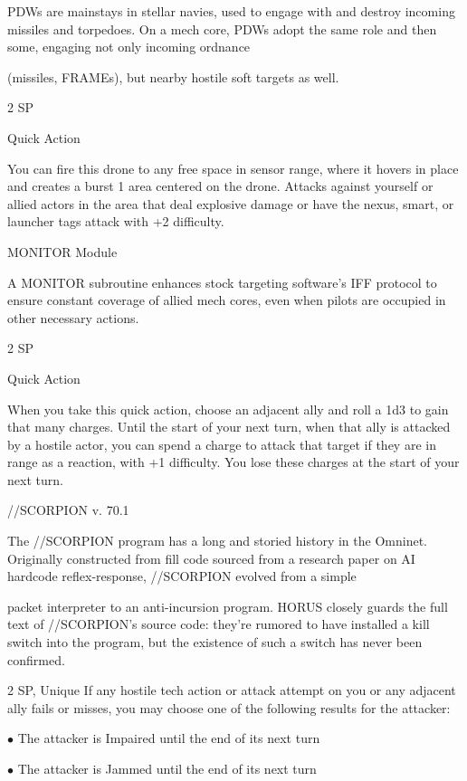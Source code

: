 PDWs are mainstays in stellar navies, used to engage with and destroy incoming missiles and torpedoes.
On a mech core, PDWs adopt the same role and then some, engaging not only incoming ordnance

(missiles, FRAMEs), but nearby hostile soft targets as well.

2 SP

Quick Action

You can fire this drone to any free space in sensor range, where it hovers in place and creates a
burst 1 area centered on the drone. Attacks against yourself or allied actors in the area that deal
explosive damage or have the nexus, smart, or launcher tags attack with +2 difficulty.


MONITOR Module

A MONITOR subroutine enhances stock targeting software’s IFF protocol to ensure constant coverage of
allied mech cores, even when pilots are occupied in other necessary actions.

2 SP

Quick Action

When you take this quick action, choose an adjacent ally and roll a 1d3 to gain that many
charges. Until the start of your next turn, when that ally is attacked by a hostile actor, you can
spend a charge to attack that target if they are in range as a reaction, with +1 difficulty. You lose
these charges at the start of your next turn.


//SCORPION v. 70.1

The //SCORPION program has a long and storied history in the Omninet. Originally constructed from fill
code sourced from a research paper on AI hardcode reflex-response, //SCORPION evolved from a simple

packet interpreter to an anti-incursion program. HORUS closely guards the full text of //SCORPION’s
source code: they’re rumored to have installed a kill switch into the program, but the existence of such a
switch has never been confirmed.

2 SP, Unique
If any hostile tech action or attack attempt on you or any adjacent ally fails or misses, you may
choose one of the following results for the attacker:

     $\bullet$    The attacker is Impaired until the end of its next turn

     $\bullet$    The attacker is Jammed until the end of its next turn





